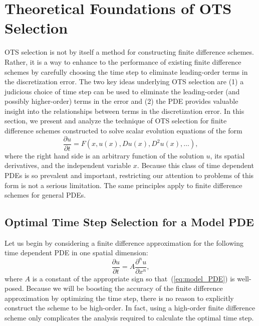 \documentclass[fleqn,12pt,twoside]{article}
\newcommand{\beq}{\begin{equation}}
\newcommand{\eeq}{\end{equation}}
\begin{document}
\section{\label{sec:OTS} Theoretical Foundations of OTS Selection}
OTS selection is not by itself a method for constructing finite difference 
schemes.  Rather, it is a way to enhance to the performance of existing 
finite difference schemes by carefully choosing the time step to eliminate
leading-order terms in the discretization error.  The two key ideas
underlying OTS selection are 
(1) a judicious choice of time step can be used to eliminate the leading-order 
(and possibly higher-order) terms in the error
and
(2) the PDE provides valuable insight into the relationships between terms
in the discretization error. 
In this section, we present and analyze the technique of OTS selection for
finite difference schemes constructed to solve scalar evolution equations of
the form 
\beq
  \frac{\partial u}{\partial t} = 
    F\left(x, u(x), D u(x), D^2 u(x), \ldots \right), 
\eeq
where the right hand side is an arbitrary function of the solution $u$, its 
spatial derivatives, and the independent variable $x$.
Because this class of time dependent PDEs is so prevalent and important, 
restricting our attention to problems of this form is not a serious 
limitation.  The same principles apply to finite difference schemes for 
general PDEs.


\subsection{\label{sec:ots_model_pde} 
            Optimal Time Step Selection for a Model PDE}
Let us begin by considering a finite difference approximation for the
following time dependent PDE in one spatial dimension: 
\beq
  \frac{\partial u}{\partial t} = A \frac{\partial^n u}{\partial x^n},
  \label{eq:model_PDE}
\eeq
where $A$ is a constant of the appropriate sign so that~(\ref{eq:model_PDE}) 
is well-posed.  Because we will be boosting the accuracy of the finite 
difference approximation by optimizing the time step, there is no reason to 
explicitly construct the scheme to be high-order.  In fact, using a high-order 
finite difference scheme only complicates the analysis required to calculate 
the optimal time step.  
\end{document}
